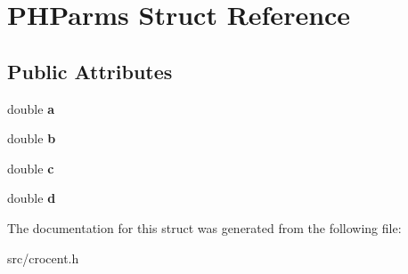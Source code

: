 \hypertarget{struct_p_h_parms}{\section{P\-H\-Parms Struct Reference}
\label{struct_p_h_parms}
}
\subsection*{Public Attributes}
\begin{DoxyCompactItemize}
\item 
\hypertarget{struct_p_h_parms_a8fde057aad11a5c459c9d55256ed27ad}{double {\bfseries a}}\label{struct_p_h_parms_a8fde057aad11a5c459c9d55256ed27ad}

\item 
\hypertarget{struct_p_h_parms_a2f44c51d9b15e988e4d790d6b7501c10}{double {\bfseries b}}\label{struct_p_h_parms_a2f44c51d9b15e988e4d790d6b7501c10}

\item 
\hypertarget{struct_p_h_parms_a8f974c7476fc92e098c8e9701ef4f84b}{double {\bfseries c}}\label{struct_p_h_parms_a8f974c7476fc92e098c8e9701ef4f84b}

\item 
\hypertarget{struct_p_h_parms_a53e47d1a87c9a5d6cc6fb59ded0309d1}{double {\bfseries d}}\label{struct_p_h_parms_a53e47d1a87c9a5d6cc6fb59ded0309d1}

\end{DoxyCompactItemize}


The documentation for this struct was generated from the following file\-:\begin{DoxyCompactItemize}
\item 
src/crocent.\-h\end{DoxyCompactItemize}
